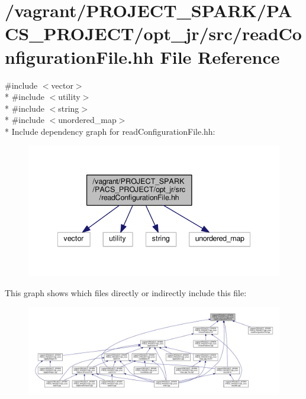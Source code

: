 \hypertarget{readConfigurationFile_8hh}{\section{/vagrant/\-P\-R\-O\-J\-E\-C\-T\-\_\-\-S\-P\-A\-R\-K/\-P\-A\-C\-S\-\_\-\-P\-R\-O\-J\-E\-C\-T/opt\-\_\-jr/src/read\-Configuration\-File.hh File Reference}
\label{readConfigurationFile_8hh}
}
{\ttfamily \#include $<$vector$>$}\\*
{\ttfamily \#include $<$utility$>$}\\*
{\ttfamily \#include $<$string$>$}\\*
{\ttfamily \#include $<$unordered\-\_\-map$>$}\\*
Include dependency graph for read\-Configuration\-File.\-hh\-:\nopagebreak
\begin{figure}[H]
\begin{center}
\leavevmode
\includegraphics[width=342pt]{readConfigurationFile_8hh__incl}
\end{center}
\end{figure}
This graph shows which files directly or indirectly include this file\-:\nopagebreak
\begin{figure}[H]
\begin{center}
\leavevmode
\includegraphics[width=350pt]{readConfigurationFile_8hh__dep__incl}
\end{center}
\end{figure}
